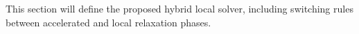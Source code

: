 This section will define the proposed hybrid local solver, including switching rules between accelerated and local relaxation phases.
